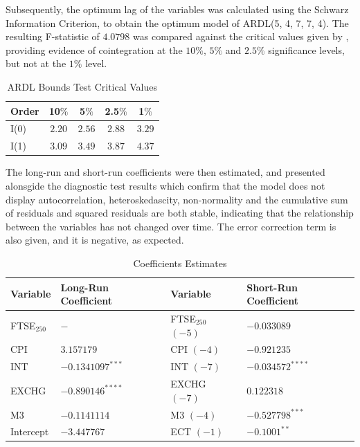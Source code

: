 \documentclass[11pt,a4paper]{article}
\newcommand{\citeboth}[1]{\citeauthor{#1} \citep{#1}}
\begin{document}
Subsequently, the optimum lag of the variables was calculated using the 
Schwarz Information Criterion, to obtain the optimum model 
of ARDL(5, 4, 7, 7, 4). The resulting F-statistic of $4.0798$ was compared against the critical values
given by \citeboth{pesaran2001}, providing evidence of cointegration 
at the $10\%$, $5\%$ and $2.5\%$ significance levels, but not at the $1\%$ 
level.

\begin{table}[h!]
    \centering
    \caption{ARDL Bounds Test Critical Values}
    \begin{tabular}{lcccc}
        \toprule
        \textbf{Order} & \textbf{10$\%$} & \textbf{5$\%$} & \textbf{2.5$\%$} & \textbf{1$\%$} \\
        \midrule
        I(0) & $2.20$ & $2.56$ & $2.88$ & $3.29$ \\
        I(1) & $3.09$ & $3.49$ & $3.87$  & $4.37$ \\
        \bottomrule
    \end{tabular}
\end{table}

The long-run and short-run coefficients were then estimated, and presented 
alonsgide the diagnostic test results which confirm that the model does not
display autocorrelation, heteroskedascity, non-normality and the cumulative 
sum of residuals and squared residuals are both stable, indicating that the 
relationship between the variables has not changed over time. The error
correction term is also given, and it is negative, as expected.

\begin{table}[h!]
    \centering
    \caption{Coefficients Estimates}
    \begin{tabular}{llll}
        \toprule
        \textbf{Variable} & \textbf{Long-Run Coefficient} & \textbf{Variable} & \textbf{Short-Run Coefficient} \\
        \midrule
        FTSE$_{250}$ & $-$ & FTSE$_{250}$ $(-5)$  & $-0.033089$ \\
        CPI & $3.157179$ & CPI $(-4)$ & $-0.921235$ \\
        INT & $-0.1341097^{***}$ & INT $(-7)$ & $-0.034572^{****}$\\
        EXCHG &  $-0.890146^{****}$ & EXCHG $(-7)$ & $0.122318$ \\
        M3 & $-0.1141114$ & M3 $(-4)$ & $-0.527798^{***}$ \\
        Intercept & $-3.447767$ & ECT $(-1)$ & $-0.1001^{**}$ \\
        \bottomrule
    \end{tabular}
\end{table}
\end{document}
